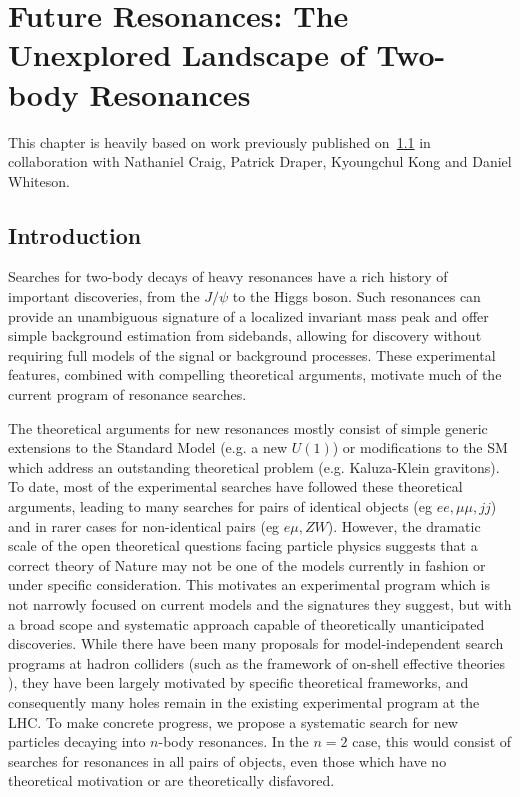 \chapter{Future Resonances: The Unexplored Landscape of Two-body Resonances}

This chapter is heavily based on work previously published on~\ref{} in collaboration with Nathaniel Craig, Patrick Draper, Kyoungchul Kong and Daniel Whiteson.

\section{Introduction}

Searches for two-body decays of heavy resonances have a rich history of important discoveries, from the $J/\psi$ to the Higgs boson.  Such resonances can provide an unambiguous signature of a localized invariant mass peak and offer simple background estimation from sidebands, allowing for discovery without requiring full models of the signal or background processes.  These experimental features, combined with compelling theoretical arguments, motivate much of the current program of resonance searches.

The theoretical arguments for new resonances mostly consist of simple generic extensions to the Standard Model (e.g. a new $U(1)$) or modifications to the SM which address an outstanding theoretical problem (e.g. Kaluza-Klein gravitons).  To date, most of the experimental searches have followed these theoretical arguments, leading to many searches for pairs of identical objects (eg $ee,\mu\mu, jj$) and in rarer cases for non-identical pairs (eg $e\mu,ZW$).   However,  the dramatic scale of the open theoretical  questions facing particle physics suggests that a correct theory of Nature may not be one of the models currently in fashion or under specific consideration.   This motivates an experimental program which is not narrowly focused on current models and the signatures they suggest, but with a broad scope and systematic approach capable of theoretically unanticipated discoveries. While there have been many proposals for model-independent search programs at hadron colliders (such as the framework of on-shell effective theories \cite{ArkaniHamed:2007fw}), they have been largely motivated by specific theoretical frameworks, and consequently many holes remain in the existing experimental program at the LHC. To make concrete progress, we propose a systematic search for new particles decaying into $n$-body resonances. In the $n=2$ case, this would consist of searches for resonances in all pairs of objects, even those which have no theoretical motivation or are theoretically disfavored.

